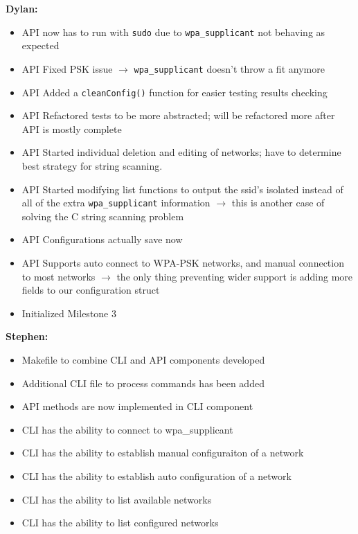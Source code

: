\documentclass[11pt]{article}
\begin{document}
\textbf{Dylan:}
\begin{itemize}
  \item API now has to run with \texttt{sudo} due to \texttt{wpa\_supplicant} not behaving as expected
  \item API Fixed PSK issue $\rightarrow$ \texttt{wpa\_supplicant} doesn't throw a fit anymore
  \item API Added a \texttt{cleanConfig()} function for easier testing results checking
  \item API Refactored tests to be more abstracted; will be refactored more after API is mostly complete
  \item API Started individual deletion and editing of networks; have to determine best strategy for string scanning.
  \item API Started modifying list functions to output the ssid's isolated instead of all of the extra \texttt{wpa\_supplicant}
    information $\rightarrow$ this is another case of solving the C string scanning problem
  \item API Configurations actually save now
  \item API Supports auto connect to WPA-PSK networks, and manual connection to most networks $\rightarrow$ the only thing
    preventing wider support is adding more fields to our configuration struct
  \item Initialized Milestone 3
\end{itemize}

\textbf{Stephen:}
\begin{itemize}
  \item Makefile to combine CLI and API components developed 
  \item Additional CLI file to process commands has been added
  \item API methods are now implemented in CLI component
  \item CLI has the ability to connect to wpa_supplicant 
  \item CLI has the ability to establish manual configuraiton of a network
  \item CLI has the ability to establish auto configuration of a network 
  \item CLI has the ability to list available networks 
  \item CLI has the ability to list configured networks 
\end{itemize}
\end{document}
